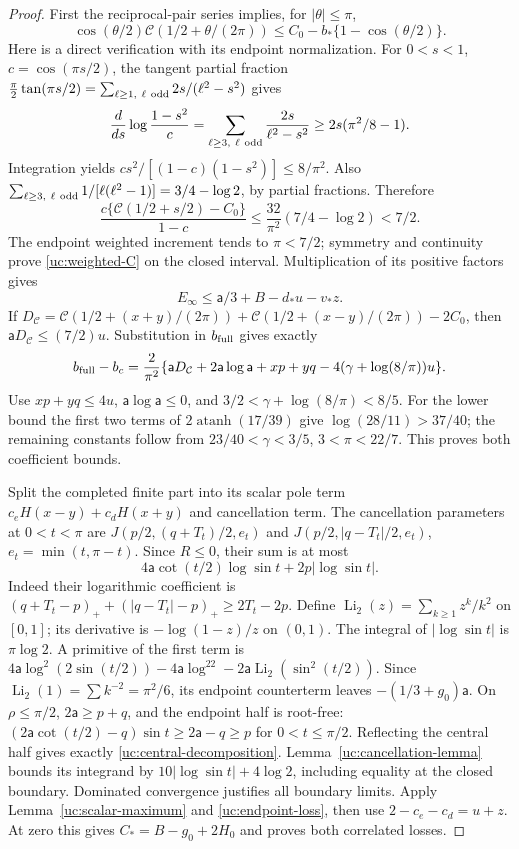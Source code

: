 \begin{proof}
First the reciprocal-pair series implies, for $|\theta|\leq\pi$,
\begin{equation}\label{uc:weighted-C}
 \cos(\theta/2)\mathcal C(1/2+\theta/(2\pi))
       \leq C_0-b_*\{1-\cos(\theta/2)\}.
\end{equation}
Here is a direct verification with its endpoint normalization.
For $0<s<1$, $c=\cos(\pi s/2)$, the tangent partial fraction
$\frac\pi2\tan(\pi s/2)=\sum_{\ell\geq1,\ \ell\ {\rm odd}}
2s/(\ell^2-s^2)$ gives
\[
 \frac{d}{ds}\log\frac{1-s^2}{c}
 =\sum_{\ell\geq3,\ \ell\ {\rm odd}}\frac{2s}{\ell^2-s^2}
 \geq2s(\pi^2/8-1).
\]
Integration yields $cs^2/[(1-c)(1-s^2)]\leq8/\pi^2$.
Also $\sum_{\ell\geq3,\ \ell\ {\rm odd}}1/[\ell(\ell^2-1)]
=3/4-\log2$, by partial fractions. Therefore
\[
 \frac{c\{\mathcal C(1/2+s/2)-C_0\}}{1-c}
 \leq\frac{32}{\pi^2}(7/4-\log2)<7/2.
\]
The endpoint weighted increment tends to $\pi<7/2$; symmetry and
continuity prove \eqref{uc:weighted-C} on the closed interval.
Multiplication of its positive factors gives
\begin{equation}\label{uc:endpoint-loss}
 E_\infty\leq \mathsf{a}/3+B-d_*u-v_*z.
\end{equation}
If $D_{\mathcal C}=\mathcal C(1/2+(x+y)/(2\pi))+
\mathcal C(1/2+(x-y)/(2\pi))-2C_0$, then $\mathsf{a}D_{\mathcal C}\leq(7/2)u$.
Substitution in $b_{\rm full}$ gives exactly
\[
 b_{\rm full}-b_c=\frac2{\pi^2}
 \{\mathsf{a}D_{\mathcal C}+2\mathsf{a}\log \mathsf{a}+xp+yq-4(\gamma+\log(8/\pi))u\}.
\]
Use $xp+yq\leq4u$, $\mathsf{a}\log \mathsf{a}\leq0$, and
$3/2<\gamma+\log(8/\pi)<8/5$. For the lower bound the first two
terms of $2\operatorname{atanh}(17/39)$ give
$\log(28/11)>37/40$; the remaining constants follow from
$23/40<\gamma<3/5$, $3<\pi<22/7$. This proves both coefficient bounds.

Split the completed finite part into its scalar pole term
$c_eH(x-y)+c_dH(x+y)$ and cancellation term. The cancellation
parameters at $0<t<\pi$ are
$J(p/2,(q+T_t)/2,e_t)$ and
$J(p/2,|q-T_t|/2,e_t)$, $e_t=\min(t,\pi-t)$.
Since $R\leq0$, their sum is at most
\[
 4\mathsf{a}\cot(t/2)\log\sin t+2p|\log\sin t|.
\]
Indeed their logarithmic coefficient is
$(q+T_t-p)_++(|q-T_t|-p)_+\geq2T_t-2p$.
Define $\operatorname{Li}_2(z)=\sum_{k\geq1}z^k/k^2$ on $[0,1]$;
its derivative is $-\log(1-z)/z$ on $(0,1)$.
The integral of $|\log\sin t|$ is $\pi\log2$. A primitive of the
first term is
$4\mathsf{a}\log^2(2\sin(t/2))-4\mathsf{a}\log^22-2\mathsf{a}\operatorname{Li}_2(\sin^2(t/2))$.
Since $\operatorname{Li}_2(1)=\sum k^{-2}=\pi^2/6$, its endpoint
counterterm leaves $-(1/3+g_0)\mathsf{a}$.
On $\rho\leq\pi/2$, $2\mathsf{a}\geq p+q$, and the endpoint half is
root-free: $(2\mathsf{a}\cot(t/2)-q)\sin t\geq2\mathsf{a}-q\geq p$ for
$0<t\leq\pi/2$. Reflecting the central half gives exactly
\eqref{uc:central-decomposition}. Lemma~\ref{uc:cancellation-lemma} bounds its
integrand by $10|\log\sin t|+4\log2$, including equality at the
closed boundary. Dominated convergence justifies all boundary limits.
Apply Lemma~\ref{uc:scalar-maximum} and \eqref{uc:endpoint-loss}, then use
$2-c_e-c_d=u+z$. At zero this gives
$C_*=B-g_0+2H_0$ and proves both correlated losses.


\end{proof}
